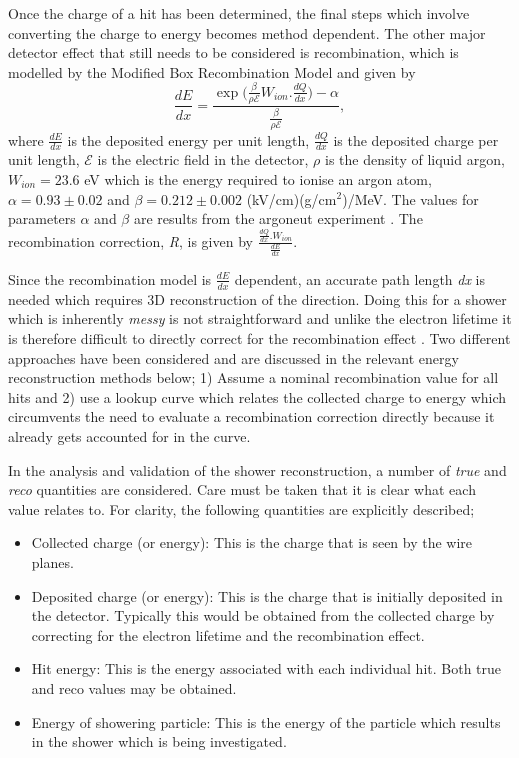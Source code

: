 Once the charge of a hit has been determined, the final steps which involve converting the charge to energy becomes method dependent. The other major detector effect that still needs to be considered is recombination, which is modelled by the Modified Box Recombination Model and given by  
\begin{equation}\label{eqn:ModBox}
    \frac{dE}{dx} = \frac{\exp{(\frac{\beta}{\rho \mathcal{E}} W_{ion}.\frac{dQ}{dx}}) - \alpha}{\frac{\beta}{\rho \mathcal{E}}},
\end{equation}
where $\frac{dE}{dx}$ is the deposited energy per unit length, $\frac{dQ}{dx}$ is the deposited charge per unit length,  $\mathcal{E}$ is the electric field in the detector, $\rho$ is the density of liquid argon, $W_{ion} = 23.6$ eV which is the energy required to ionise an argon atom, $\alpha = 0.93 \pm 0.02$ and $\beta = 0.212 \pm 0.002$ (kV/cm)(g/cm$^2$)/MeV. The values for parameters $\alpha$ and $\beta$ are results from the \Gls{argoneut} experiment \cite{ArgoNeuT_recombination_paper}. The recombination correction, \textit{R}, is given by $\frac{\frac{dQ}{dx}.W_{ion}}{\frac{dE}{dx}}$.


Since the recombination model is $\frac{dE}{dx}$ dependent, an accurate path length \textit{dx} is needed which requires 3D reconstruction of the direction. Doing this for a shower which is inherently \textit{messy} is not straightforward and unlike the electron lifetime it is therefore difficult to directly correct for the recombination effect \cite{MicroBooNE_photon_Ereco_paper}. Two different approaches have been considered and are discussed in the relevant energy reconstruction methods below; 1) Assume a nominal recombination value for all hits and 2) use a lookup curve which relates the collected charge to energy which circumvents the need to evaluate a recombination correction directly because it already gets accounted for in the curve.

In the analysis and validation of the shower reconstruction, a number of \textit{true} and \textit{reco} quantities are considered. Care must be taken that it is clear what each value relates to. For clarity, the following quantities are explicitly described;
\begin{itemize}
    \item Collected charge (or energy): This is the charge that is seen by the wire planes. 
    \item Deposited charge (or energy): This is the charge that is initially deposited in the detector. Typically this would be obtained from the collected charge by correcting for the electron lifetime and the recombination effect.
    \item Hit energy: This is the energy associated with each individual hit. Both true and reco values may be obtained.
    \item Energy of showering particle: This is the energy of the particle which results in the shower which is being investigated. 
\end{itemize}
